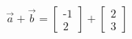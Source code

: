 \documentclass[preview]{standalone}
\begin{document}
\begin{align*}
\vec{a} + \vec{b} = \begin{bmatrix} \text{-}1 \\ 2 \end{bmatrix} + \begin{bmatrix} 2 \\ 3 \end{bmatrix}
\end{align*}
\end{document}
